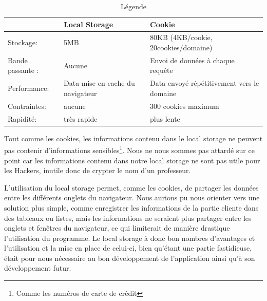 \begin{table}[!h]
\begin{center}
\begin{tabular}{|l|l|l|}
  	\hline
   		& Local Storage & Cookie \\
  	\hline
  		Stockage: & 5MB & 80KB (4KB/cookie, 20cookies/domaine) \\
	\hline  
		Bande passante : & Aucune & Envoi de données à chaque requête \\
  	\hline
  		Performance: & Data mise en cache du navigateur & Data envoyé répétitivement vers le domaine \\
  	\hline
  		Contraintes: & aucune & 300 cookies maximum \\
  	\hline
  		Rapidité: & très rapide & plus lente \\
  	\hline
\end{tabular}
\end{center}
\caption{Légende}
\label{local_storage}
\end{table}


Tout comme les cookies, les informations contenu dans le local storage ne peuvent pas contenir d'informations sensibles\footnote{Comme les numéros de carte de crédit}. Nous ne nous sommes pas attardé sur ce point car les informations contenu dans notre local storage ne sont pas utile pour les Hackers, inutile donc de crypter le nom d'un professeur. 

L'utilisation du local storage permet, comme les cookies, de partager les données entre les différents onglets du navigateur. Nous aurions pu nous orienter vers une solution plus simple, comme enregistrer les informations de la partie cliente dans des tableaux ou listes, mais les informations ne seraient plus partager entre les onglets et fenêtres du navigateur, ce qui limiterait de manière drastique l'utilisation du programme. Le local storage à donc bon nombres d'avantages et l'utilisation et la mise en place de celui-ci, bien qu'étant une partie fastidieuse, était pour nous nécessaire au bon développement de l'application ainsi qu'à son développement futur.

